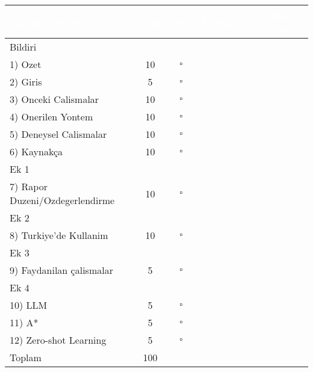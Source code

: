 \documentclass{article}
\begin{document}
\begin{table}[h]
\centering
\begin{tabular}{|l|c|c|p{5cm}|c|}
\hline
\rowcolor{navy}\textcolor{white}{Madde Numarasi} & \textcolor{white}{Puan} & \textcolor{white}{Var} & \textcolor{white}{Aciklama} & \textcolor{white}{Tahmini Puan} \\
\hline
\multicolumn{5}{|l|}{\cellcolor{gray!20}Bildiri} \\
\hline
1) Ozet & 10 & $\square$ & & \\
\hline
2) Giris & 5 & $\square$ & & \\
\hline
3) Onceki Calismalar & 10 & $\square$ & & \\
\hline
4) Onerilen Yontem & 10 & $\square$ & & \\
\hline
5) Deneysel Calismalar & 10 & $\square$ & & \\
\hline
6) Kaynakça & 10 & $\square$ & & \\
\hline
\multicolumn{5}{|l|}{\cellcolor{gray!20}Ek 1} \\
\hline
7) Rapor Duzeni/Ozdegerlendirme & 10 & $\square$ & & \\
\hline
\multicolumn{5}{|l|}{\cellcolor{gray!20}Ek 2} \\
\hline
8) Turkiye'de Kullanim & 10 & $\square$ & & \\
\hline
\multicolumn{5}{|l|}{\cellcolor{gray!20}Ek 3} \\
\hline
9) Faydanilan çalismalar & 5 & $\square$ & & \\
\hline
\multicolumn{5}{|l|}{\cellcolor{gray!20}Ek 4} \\
\hline
10) LLM  & 5 & $\square$ & & \\
\hline
\hline
11) A*  & 5 & $\square$ & & \\
\hline
\hline
12) Zero-shot Learning & 5 & $\square$ & & \\
\hline

\rowcolor{gray!10}Toplam & 100 & & & \\
\hline
\end{tabular}
\end{table}
\end{document}
